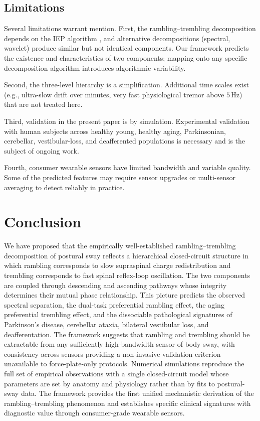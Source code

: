 \documentclass[11pt,twocolumn,a4paper]{article}
\theoremstyle{definition}
\theoremstyle{remark}
\begin{document}
\subsection{Limitations}

Several limitations warrant mention. First, the
rambling--trembling decomposition depends on the IEP algorithm
\citep{zatsiorsky2000}, and alternative decompositions (spectral,
wavelet) produce similar but not identical components. Our
framework predicts the existence and characteristics of two
components; mapping onto any specific decomposition algorithm
introduces algorithmic variability.

Second, the three-level hierarchy is a simplification. Additional
time scales exist (e.g., ultra-slow drift over minutes, very fast
physiological tremor above $5$\,Hz) that are not treated here.

Third, validation in the present paper is by simulation.
Experimental validation with human subjects across healthy young,
healthy aging, Parkinsonian, cerebellar, vestibular-loss, and
deafferented populations is necessary and is the subject of
ongoing work.

Fourth, consumer wearable sensors have limited bandwidth and
variable quality. Some of the predicted features may require
sensor upgrades or multi-sensor averaging to detect reliably in
practice.


\section{Conclusion}
\label{sec:conclusion}

We have proposed that the empirically well-established
rambling--trembling decomposition of postural sway reflects a
hierarchical closed-circuit structure in which rambling corresponds
to slow supraspinal charge redistribution and trembling corresponds
to fast spinal reflex-loop oscillation. The two components are
coupled through descending and ascending pathways whose integrity
determines their mutual phase relationship. This picture predicts
the observed spectral separation, the dual-task preferential
rambling effect, the aging preferential trembling effect, and the
dissociable pathological signatures of Parkinson's disease,
cerebellar ataxia, bilateral vestibular loss, and deafferentation.
The framework suggests that rambling and trembling should be
extractable from any sufficiently high-bandwidth sensor of body
sway, with consistency across sensors providing a non-invasive
validation criterion unavailable to force-plate-only protocols.
Numerical simulations reproduce the full set of empirical
observations with a single closed-circuit model whose parameters
are set by anatomy and physiology rather than by fits to
postural-sway data. The framework provides the first unified
mechanistic derivation of the rambling--trembling phenomenon and
establishes specific clinical signatures with diagnostic value
through consumer-grade wearable sensors.




\end{document}
